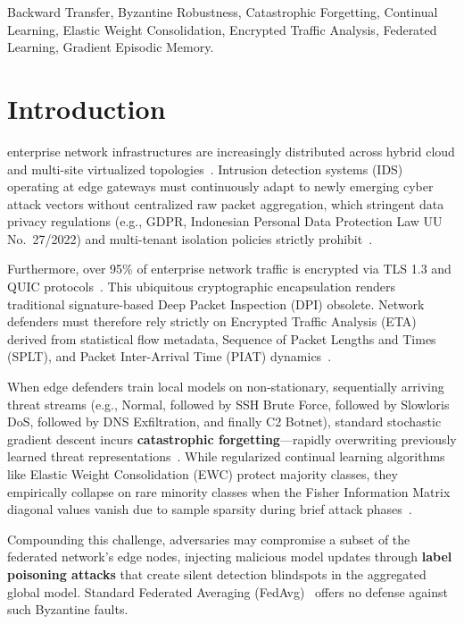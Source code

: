 \documentclass[journal,10pt,twocolumn]{IEEEtran}
\begin{document}
\begin{IEEEkeywords}
Backward Transfer, Byzantine Robustness, Catastrophic Forgetting, Continual Learning, Elastic Weight Consolidation, Encrypted Traffic Analysis, Federated Learning, Gradient Episodic Memory.
\end{IEEEkeywords}

\section{Introduction}
 enterprise network infrastructures are increasingly distributed across hybrid cloud and multi-site virtualized topologies~\cite{ulya2025perancangan}. Intrusion detection systems (IDS) operating at edge gateways must continuously adapt to newly emerging cyber attack vectors without centralized raw packet aggregation, which stringent data privacy regulations (e.g., GDPR, Indonesian Personal Data Protection Law UU No.~27/2022) and multi-tenant isolation policies strictly prohibit~\cite{bunko2026survey, hernandez2025intrusion}.

Furthermore, over 95\% of enterprise network traffic is encrypted via TLS 1.3 and QUIC protocols~\cite{wang2017malware}. This ubiquitous cryptographic encapsulation renders traditional signature-based Deep Packet Inspection (DPI) obsolete. Network defenders must therefore rely strictly on Encrypted Traffic Analysis (ETA) derived from statistical flow metadata, Sequence of Packet Lengths and Times (SPLT), and Packet Inter-Arrival Time (PIAT) dynamics~\cite{sharafaldin2018toward}.

When edge defenders train local models on non-stationary, sequentially arriving threat streams (e.g., Normal, followed by SSH Brute Force, followed by Slowloris DoS, followed by DNS Exfiltration, and finally C2 Botnet), standard stochastic gradient descent incurs \textbf{catastrophic forgetting}---rapidly overwriting previously learned threat representations~\cite{kirkpatrick2017overcoming}. While regularized continual learning algorithms like Elastic Weight Consolidation (EWC) protect majority classes, they empirically collapse on rare minority classes when the Fisher Information Matrix diagonal values vanish due to sample sparsity during brief attack phases~\cite{hamedi2025federated, birashk2025federated}.

Compounding this challenge, adversaries may compromise a subset of the federated network's edge nodes, injecting malicious model updates through \textbf{label poisoning attacks} that create silent detection blindspots in the aggregated global model. Standard Federated Averaging (FedAvg)~\cite{mcmahan2017communication} offers no defense against such Byzantine faults.
\end{document}
